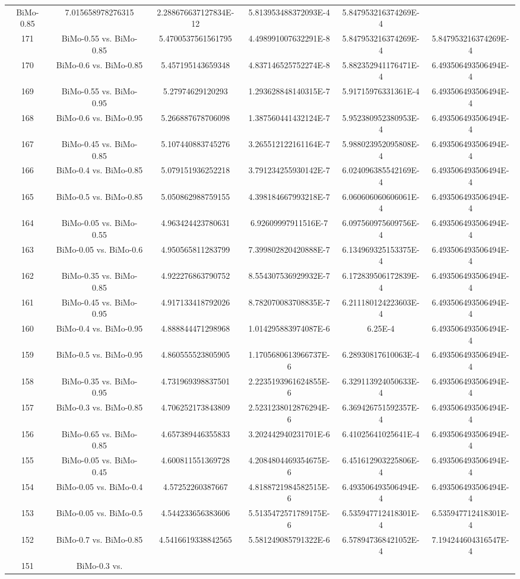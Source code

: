 \documentclass[a4paper,10pt]{article}
\begin{document}
\begin{landscape}
\begin{table}[!htp]
\begin{tabular}{cccccc}
BiMo-0.85&7.015658978276315&2.288676637127834E-12&5.813953488372093E-4&5.847953216374269E-4\\171&BiMo-0.55 vs. BiMo-0.85&5.4700537561561795&4.498991007632291E-8&5.847953216374269E-4&5.847953216374269E-4\\170&BiMo-0.6 vs. BiMo-0.85&5.457195143659348&4.837146525752274E-8&5.882352941176471E-4&6.493506493506494E-4\\169&BiMo-0.55 vs. BiMo-0.95&5.27974629120293&1.293628848140315E-7&5.91715976331361E-4&6.493506493506494E-4\\168&BiMo-0.6 vs. BiMo-0.95&5.266887678706098&1.387560441432124E-7&5.952380952380953E-4&6.493506493506494E-4\\167&BiMo-0.45 vs. BiMo-0.85&5.107440883745276&3.265512122161164E-7&5.988023952095808E-4&6.493506493506494E-4\\166&BiMo-0.4 vs. BiMo-0.85&5.079151936252218&3.791234255930142E-7&6.024096385542169E-4&6.493506493506494E-4\\165&BiMo-0.5 vs. BiMo-0.85&5.050862988759155&4.398184667993218E-7&6.060606060606061E-4&6.493506493506494E-4\\164&BiMo-0.05 vs. BiMo-0.55&4.963424423780631&6.92609997911516E-7&6.097560975609756E-4&6.493506493506494E-4\\163&BiMo-0.05 vs. BiMo-0.6&4.950565811283799&7.399802820420888E-7&6.134969325153375E-4&6.493506493506494E-4\\162&BiMo-0.35 vs. BiMo-0.85&4.922276863790752&8.554307536929932E-7&6.172839506172839E-4&6.493506493506494E-4\\161&BiMo-0.45 vs. BiMo-0.95&4.917133418792026&8.782070083708835E-7&6.211180124223603E-4&6.493506493506494E-4\\160&BiMo-0.4 vs. BiMo-0.95&4.888844471298968&1.014295883974087E-6&6.25E-4&6.493506493506494E-4\\159&BiMo-0.5 vs. BiMo-0.95&4.860555523805905&1.1705680613966737E-6&6.28930817610063E-4&6.493506493506494E-4\\158&BiMo-0.35 vs. BiMo-0.95&4.731969398837501&2.2235193961624855E-6&6.329113924050633E-4&6.493506493506494E-4\\157&BiMo-0.3 vs. BiMo-0.85&4.706252173843809&2.5231238012876294E-6&6.369426751592357E-4&6.493506493506494E-4\\156&BiMo-0.65 vs. BiMo-0.85&4.657389446355833&3.202442940231701E-6&6.41025641025641E-4&6.493506493506494E-4\\155&BiMo-0.05 vs. BiMo-0.45&4.600811551369728&4.2084804469354675E-6&6.451612903225806E-4&6.493506493506494E-4\\154&BiMo-0.05 vs. BiMo-0.4&4.57252260387667&4.8188721984582515E-6&6.493506493506494E-4&6.493506493506494E-4\\153&BiMo-0.05 vs. BiMo-0.5&4.544233656383606&5.5135472571789175E-6&6.535947712418301E-4&6.535947712418301E-4\\152&BiMo-0.7 vs. BiMo-0.85&4.5416619338842565&5.581249085791322E-6&6.578947368421052E-4&7.194244604316547E-4\\151&BiMo-0.3 vs. 
\end{tabular}
\end{table}
\end{landscape}
\end{document}

